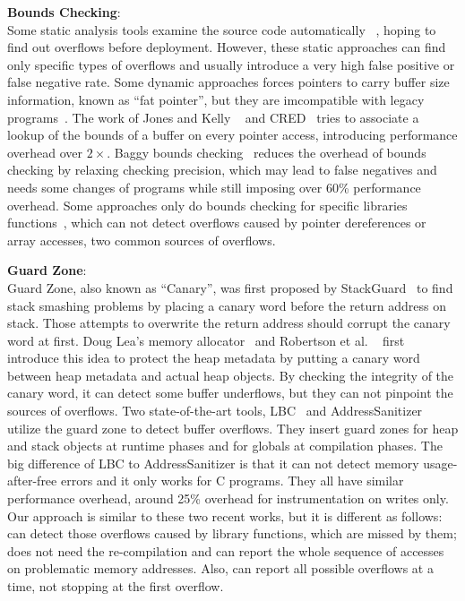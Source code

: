 \textbf{Bounds Checking}: \\ 
Some static analysis tools examine the source code automatically 
~\cite{Wagner00afirst, CSSV}, hoping to find out overflows before deployment. 
However, these static
approaches can find only specific types of overflows and usually introduce a
very high false positive or false negative rate. 
Some dynamic approaches forces pointers to carry buffer size information, known 
as ``fat pointer'', but they are imcompatible with legacy programs~\cite{Austinpldi1994, Cyclone, CCured}.
The work of Jones and Kelly ~\cite{Jones97backwardscompatiblebounds} and 
CRED~\cite{CRED} tries to associate a lookup of the bounds of a buffer
on every pointer access, introducing performance overhead over $2\times$.
Baggy bounds checking~\cite{overflow:Baggy} reduces the overhead of bounds checking by 
relaxing checking precision, 
which may lead to false negatives and needs some changes of programs while still imposing 
over 60\% performance overhead. 
Some approaches only do bounds checking for specific libraries 
functions~\cite{Libsafe, LibsafePlus, HeapShield}, which can not detect overflows caused by 
pointer dereferences or array accesses, two common sources of overflows.   
 
\textbf{Guard Zone}: \\
Guard Zone, also known as ``Canary'', was first proposed by StackGuard~\cite{StackGuard} to find
stack smashing problems by placing a canary word before the return address on stack. Those attempts to
overwrite the return address should corrupt the canary word at first. 
Doug Lea's memory allocator~\cite{dlmalloc} and Robertson et al. ~\cite{Robertson:2003:RDH:1051937.1051947} first introduce this idea to protect the heap metadata by putting a canary
word between heap metadata and actual heap objects. By checking the integrity of 
the canary word, it can detect some buffer underflows, but they can not pinpoint the sources of overflows.
Two state-of-the-art tools, LBC~\cite{overflow:lbc} and AddressSanitizer~\cite{AddressSanitizer} utilize
the guard zone to detect buffer overflows. 
They insert guard zones for heap and stack objects at runtime phases and for globals at 
compilation phases. The big difference of LBC to AddressSanitizer is that it can not 
detect memory usage-after-free errors and it only works for C programs. 
They all have similar performance overhead, around 
25\% overhead for instrumentation on writes only.  
Our approach is similar to these two recent works, but it is different as follows: 
\stopgap{} can detect those overflows 
caused by library functions, which are missed by them; \stopgap{} does not need the re-compilation 
and can report the whole sequence of accesses on
problematic memory addresses. Also, \stopgap{} can report all possible overflows at a time, not 
stopping at the first overflow. 

